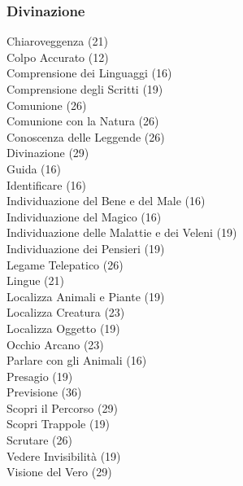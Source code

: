 \begin{multicols}{3}
	\subsubsection{Divinazione}
	Chiaroveggenza (21)\\
	Colpo Accurato (12)\\
	Comprensione dei Linguaggi (16)\\
	Comprensione degli Scritti (19)\\
	Comunione (26)\\
	Comunione con la Natura (26)\\
	Conoscenza delle Leggende (26)\\
	Divinazione (29)\\
	Guida (16)\\
	Identificare (16)\\
	Individuazione del Bene e del Male (16)\\
	Individuazione del Magico (16)\\
	Individuazione delle Malattie e dei Veleni (19)\\
	Individuazione dei Pensieri (19)\\
	Legame Telepatico (26)\\
	Lingue (21)\\
	Localizza Animali e Piante (19)\\
	Localizza Creatura (23)\\
	Localizza Oggetto (19)\\
	Occhio Arcano (23)\\
	Parlare con gli Animali (16)\\
	Presagio (19)\\
	Previsione (36)\\
	Scopri il Percorso (29)\\
	Scopri Trappole (19)\\
	Scrutare (26)\\
	Vedere Invisibilità (19)\\
	Visione del Vero (29)\\
	

\end{multicols}
